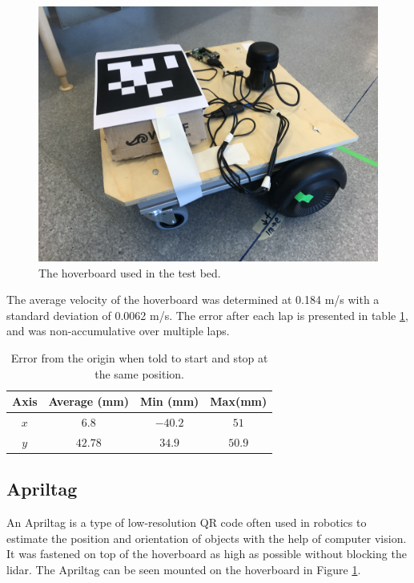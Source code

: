 \documentclass[nofilelist]{cslthse-msc}
\begin{document}
\begin{figure}[!hbt]
   \centering
   \includegraphics[scale=0.07]{images/hoverboard.jpg} 
   \caption{The hoverboard used in the test bed.}
   \label{fig:hoverboard}
\end{figure}

The average velocity of the hoverboard was determined at 0.184 m/s with a standard deviation of 0.0062 m/s. The error after each lap is presented in table \ref{tab:hoverboard-error}, and was non-accumulative over multiple laps. 

\begin{table}[!hbt]
   \centering
   \begin{tabular}{|c|c|c|c|}
      \hline
      \textbf{Axis} & \textbf{Average (mm)} & \textbf{Min (mm)} & \textbf{Max(mm)} \\
      \hline
      $x$ & $6.8 $ & $-40.2$ & $51$ \\
      \hline
      $y$ & $42.78$ & $34.9$ & $50.9$ \\
      \hline
   \end{tabular}
   \caption{Error from the origin when told to start and stop at the same position.}
   \label{tab:hoverboard-error}
\end{table}

\subsection{Apriltag}
An Apriltag is a type of low-resolution QR code often used in robotics to estimate the position and orientation of objects with the help of computer vision. It was fastened on top of the hoverboard as high as possible without blocking the lidar. The Apriltag can be seen mounted on the hoverboard in Figure \ref{fig:hoverboard}.
\end{document}
